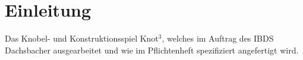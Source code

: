 \chapter{Einleitung}

Das Knobel- und Konstruktionsspiel Knot$^3$, welches im Auftrag des IBDS Dachsbacher ausgearbeitet und wie im Pflichtenheft spezifiziert angefertigt wird.